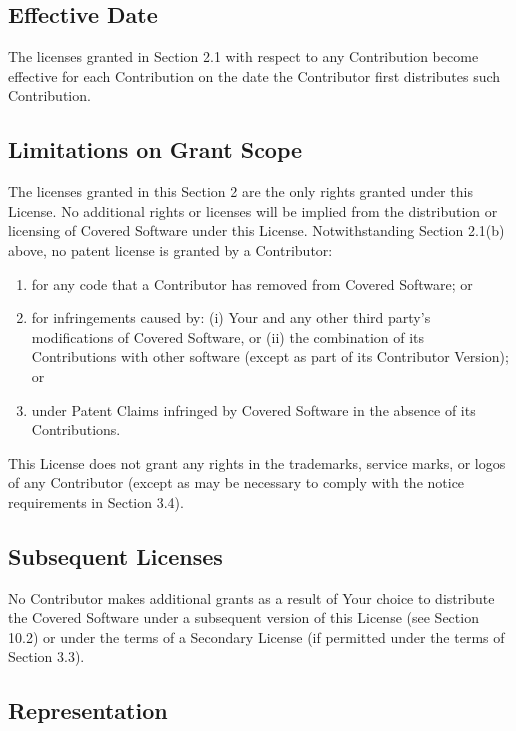 \documentclass[a4paper, 12pt]{article}
\begin{document}
\subsection{Effective Date}

The licenses granted in Section 2.1 with respect to any Contribution become effective for each Contribution on the date the Contributor first distributes such Contribution.

\subsection{Limitations on Grant Scope}

The licenses granted in this Section 2 are the only rights granted under this License. No additional rights or licenses will be implied from the distribution or licensing of Covered Software under this License. Notwithstanding Section 2.1(b) above, no patent license is granted by a Contributor:

\begin{enumerate}[label=(\alph*)]
\item for any code that a Contributor has removed from Covered Software; or
\item for infringements caused by: (i) Your and any other third party's modifications of Covered Software, or (ii) the combination of its Contributions with other software (except as part of its Contributor Version); or
\item under Patent Claims infringed by Covered Software in the absence of its Contributions.
\end{enumerate}

This License does not grant any rights in the trademarks, service marks, or logos of any Contributor (except as may be necessary to comply with the notice requirements in Section 3.4).

\subsection{Subsequent Licenses}

No Contributor makes additional grants as a result of Your choice to distribute the Covered Software under a subsequent version of this License (see Section 10.2) or under the terms of a Secondary License (if permitted under the terms of Section 3.3).

\subsection{Representation}
\end{document}
